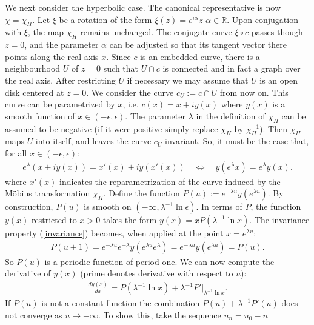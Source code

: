 We next consider the hyperbolic case. The canonical representative
is now $\chi = \chi_{H}$. Let $\xi$ be a rotation of the form
$\xi(z) = e^{i\alpha} z$ $\alpha \in \mathbb{R}$. Upon conjugation with
$\xi$, the map $\chi_H$ remains unchanged.  The conjugate
curve 
$\xi \circ c$ passes though $z=0$, and the parameter $\alpha$ can be
adjusted so that its tangent vector there points along the
real axis $x$.
Since $c$ is an embedded curve, there is a 
neighbourhood $U$ of $z=0$ such that $U \cap c$ is connected 
and in fact a graph over
the real axis. 
After restricting $U$ if necessary we may assume that
$U$ is an open disk centered at $z=0$.
We consider the curve $c_U := c \cap U$ from now on.
This curve can be parametrized by $x$, i.e.
$c(x) = x + i y(x)$ where $y(x)$
is a smooth function of $x \in 
(-\epsilon,\epsilon)$. The parameter $\lambda$
in the definition of 
$\chi_H$ can be assumed to be negative
(if it were positive simply replace 
$\chi_H$ by $\chi_H^{-1}$). Then $\chi_H$ maps $U$ into itself, and leaves
the curve $c_U$ invariant. So, it must be the case
that, for all $x \in (- \epsilon, \epsilon)$:
\begin{align}
e^{\lambda} ( x + i y(x) ) = x' (x) + i y(x'(x))  \quad
\Longleftrightarrow  \quad y(e^{\lambda} x) = e^{\lambda} y(x).
\label{invariance}
\end{align}
where $x'(x)$ indicates the reparametrization of the curve induced
by the M\"obius transformation $\chi_H$. Define the function
$P(u) := e^{-\lambda u} y(e^{\lambda u})$. By construction, $P(u)$ is smooth
on $(-\infty,\lambda^{-1} \ln \epsilon)$. In terms of $P$, the function $y(x)$ restricted to $x>0$ takes the form $y(x)= x P(\lambda^{-1} \ln x)$. 
The  invariance property (\ref{invariance}) becomes, when
applied at the point $x = e^{\lambda u}$:
\begin{align*}
P(u+1)= e^{-\lambda u} e^{-\lambda} y(e^{\lambda u} e^{\lambda} )
= e^{-\lambda u} y (e^{\lambda u} )= P(u).
\end{align*}
So $P(u)$ is a periodic function of period one. We can now compute
the derivative of $y(x)$ (prime denotes derivative with respect to $u$):
\begin{align*}
\frac{dy(x)}{dx} = 
P(\lambda^{-1} \ln x) + \lambda^{-1} P' |_{\lambda^{-1} \ln x}.
\end{align*}
If $P(u)$ is not a constant function
the combination $P(u) + \lambda^{-1} P'(u)$ does not converge 
as $u \rightarrow - \infty$. To show this, take the sequence $u_n = u_0 - n$
